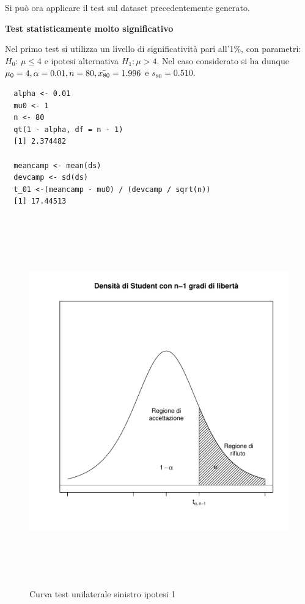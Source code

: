 Si può ora applicare il test sul dataset precedentemente generato.


\vspace{5mm}
\noindent \textbf{Test statisticamente molto significativo}

Nel primo test si utilizza un livello di significatività pari all'1\%, con parametri: $H_0$: $\mu \leq 4$ e ipotesi alternativa $H_1: \mu > 4$. Nel caso considerato si ha dunque $\mu_0 = 4, \alpha = 0.01, n = 80, \Bar{x_{80}} = 1.996$ e $s_{80} = 0.510$.

\vspace{5mm}
\begin{lstlisting}
  alpha <- 0.01
  mu0 <- 1
  n <- 80
  qt(1 - alpha, df = n - 1)
  [1] 2.374482
  
  meancamp <- mean(ds)
  devcamp <- sd(ds)
  t_01 <-(meancamp - mu0) / (devcamp / sqrt(n))
  [1] 17.44513
\end{lstlisting}

\begin{figure}[!htb]
    \centering
    \includegraphics[height=16cm]{capitoli/images/3_verifica_ipotesi/curvehp3.pdf}
    \caption{Curva test unilaterale sinistro ipotesi 1}
\end{figure}

